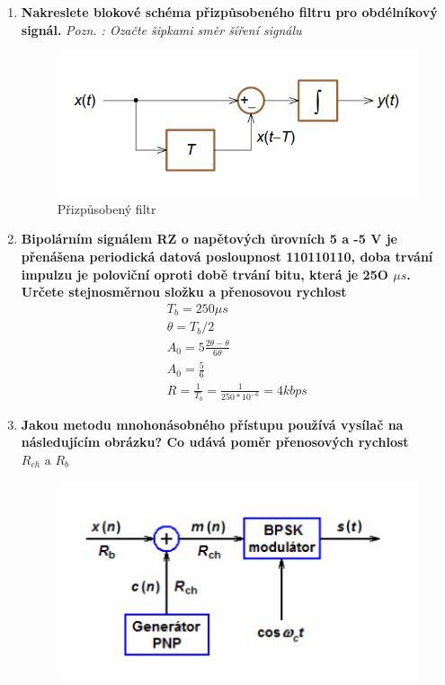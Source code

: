 \begin{enumerate}
    \item \textbf{Nakreslete blokové schéma přizpůsobeného filtru pro obdélníkový signál.} \textit{Pozn. : Ozačte šipkami směr šíření signálu}
    \begin{figure}[h!]
        \centering
        \includegraphics[scale=0.5]{images/prizfiltr.png}
        \caption{Přizpůsobený filtr}
        \label{fig:enter-label}
    \end{figure}
    \clearpage
    \item \textbf{Bipolárním signálem RZ o napětových ůrovních 5 a -5 V je přenášena periodická datová posloupnost 110110110, doba trvání impulzu je poloviční oproti době trvání bitu, která je 25O $\mu s$. Určete stejnosměrnou složku a přenosovou rychlost} 
    \begin{gather*}
        T_b=250 \mu s \\
        \theta = T_b/2 \\
        A_0=5\frac{2\theta-\theta}{6\theta} \\
        A_0=\frac{5}{6} \\
        R=\frac{1}{T_b} = \frac{1}{250*10^{-6}} = 4kbps
    \end{gather*}
    \item \textbf{Jakou metodu mnohonásobného přístupu používá vysílač na následujícím obrázku? Co udává poměr přenosových rychlost $R_{ch} \textrm{ a } R_b$}
    \begin{figure}[h!]
        \centering
        \includegraphics{images/DS.png}
        \label{fig:enter-label}
    \end{figure}
    

\end{enumerate}
